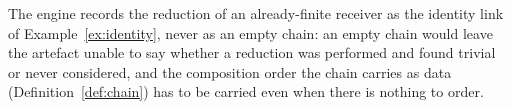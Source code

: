
\begin{requirement}\label{req:identity-link-recorded}
The engine records the reduction of an already-finite receiver as the
identity link of Example~\ref{ex:identity}, never as an empty chain: an empty
chain would leave the artefact unable to say whether a reduction was performed
and found trivial or never considered, and the composition order the chain
carries as data (Definition~\ref{def:chain}) has to be carried even when there
is nothing to order.
\end{requirement}
